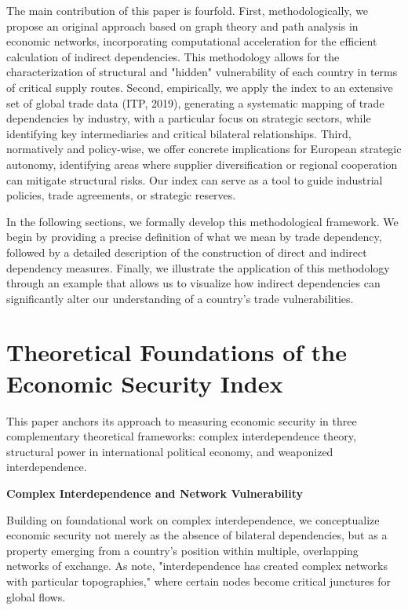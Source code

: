 \documentclass[final,1p,times,authoryear]{elsarticle}
\begin{document}
The main contribution of this paper is fourfold. First, methodologically, we propose an original approach based on graph theory and path analysis in economic networks, incorporating computational acceleration for the efficient calculation of indirect dependencies. This methodology allows for the characterization of structural and "hidden" vulnerability of each country in terms of critical supply routes. Second, empirically, we apply the index to an extensive set of global trade data (ITP, 2019), generating a systematic mapping of trade dependencies by industry, with a particular focus on strategic sectors, while identifying key intermediaries and critical bilateral relationships. Third, normatively and policy-wise, we offer concrete implications for European strategic autonomy, identifying areas where supplier diversification or regional cooperation can mitigate structural risks. Our index can serve as a tool to guide industrial policies, trade agreements, or strategic reserves.

In the following sections, we formally develop this methodological framework. We begin by providing a precise definition of what we mean by trade dependency, followed by a detailed description of the construction of direct and indirect dependency measures. Finally, we illustrate the application of this methodology through an example that allows us to visualize how indirect dependencies can significantly alter our understanding of a country’s trade vulnerabilities.

\section{Theoretical Foundations of the Economic Security Index}

This paper anchors its approach to measuring economic security in three complementary theoretical frameworks: complex interdependence theory, structural power in international political economy, and weaponized interdependence.

\textbf{Complex Interdependence and Network Vulnerability}

Building on \cite{keohane1977power} foundational work on complex interdependence, we conceptualize economic security not merely as the absence of bilateral dependencies, but as a property emerging from a country's position within multiple, overlapping networks of exchange. As \cite{farrell2019weaponized} note, "interdependence has created complex networks with particular topographies," where certain nodes become critical junctures for global flows.
\end{document}
